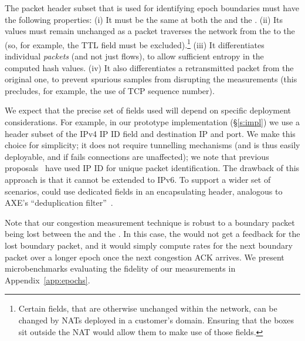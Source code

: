 The packet header subset that is used for identifying epoch boundaries must have the following properties:
(i) It must be the same at both the \inbox and the \outbox.
(ii) Its values must remain unchanged as a packet traverses the network from the \inbox to the \outbox (so, for example, the TTL field must be excluded).\footnote{Certain fields, that are otherwise unchanged within the network, can be changed by NATs deployed in a customer's domain. Ensuring that the \name boxes sit outside the NAT would allow them to make use of those fields.}
(iii) It differentiates individual \emph{packets} (and not just flows), to allow sufficient entropy in the computed hash values.
(iv) It also differentiates a retransmitted packet from the original one, to prevent spurious samples from disrupting the measurements (this precludes, for example, the use of TCP sequence number).

We expect that the precise set of fields used will depend on specific deployment considerations.
For example, in our prototype implementation (\S\ref{s:impl}) we use a header subset of the IPv4 IP ID field and destination IP and port. 
We make this choice for simplicity; it does not require tunnelling mechanisms (and is thus easily deployable, and if \name fails connections are unaffected); we note that previous proposals~\cite{ip-traceback} have used IP ID for unique packet identification. 
The drawback of this approach is that it cannot be extended to IPv6.
To support a wider set of scenarios, \name could use dedicated fields in an encapsulating header, analogous to AXE's ``deduplication filter''~\cite{axe}.

Note that our congestion measurement technique is robust to a boundary packet being lost between the \inbox and the \outbox. In this case, the \inbox would not get a feedback for the lost boundary packet, and it would simply compute rates for the next boundary packet over a longer epoch once the next congestion ACK arrives. We present microbenchmarks evaluating the fidelity of our measurements in Appendix~\ref{app:epochs}.


